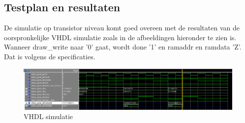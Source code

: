 \documentclass{scrartcl} %
\begin{document}
\subsection{Testplan en resultaten}
 De simulatie op transistor niveau komt goed overeen met de resultaten van de oorspronkelijke VHDL simulatie zoals in de afbeeldingen hieronder te zien is. Wanneer draw\_write naar '0' gaat, wordt done '1'  en ramaddr en ramdata 'Z'. Dat is volgens de specificaties. 
\begin{figure} [h!]
\includegraphics [width = \textwidth] {resource/dp_sim}
\caption{VHDL simulatie}
\label{fig:dp_sim}
\end{figure}
\end{document}
